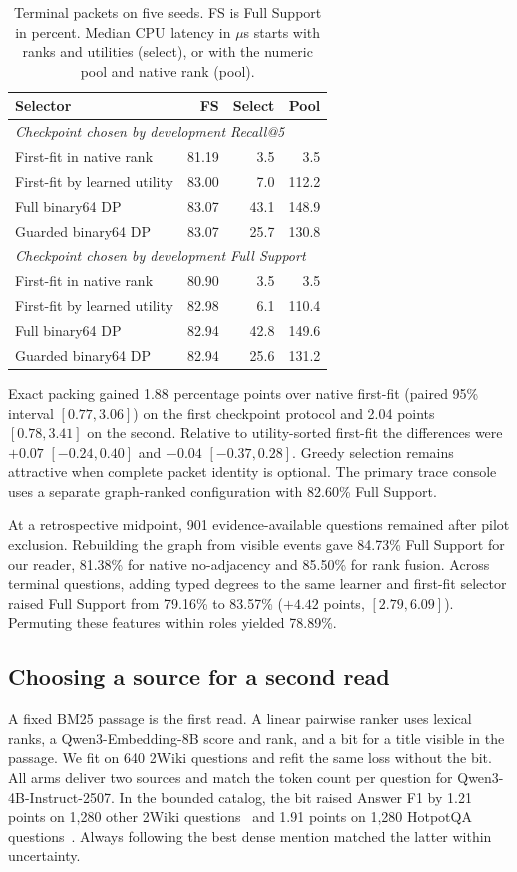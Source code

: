 \documentclass[conference]{IEEEtran}
\begin{document}
\begin{table}[t]
\caption{Terminal packets on five seeds. FS is Full Support in percent. Median CPU latency in $\mu$s starts with ranks and utilities (select), or with the numeric pool and native rank (pool).}
\centering\small
\begin{tabular}{@{}lrrr@{}}\toprule
Selector & FS & Select & Pool\\\midrule
\multicolumn{4}{l}{\textit{Checkpoint chosen by development Recall@5}}\\
First-fit in native rank & 81.19 & 3.5 & 3.5\\
First-fit by learned utility & 83.00 & 7.0 & 112.2\\
Full binary64 DP & 83.07 & 43.1 & 148.9\\
Guarded binary64 DP & 83.07 & 25.7 & 130.8\\\midrule
\multicolumn{4}{l}{\textit{Checkpoint chosen by development Full Support}}\\
First-fit in native rank & 80.90 & 3.5 & 3.5\\
First-fit by learned utility & 82.98 & 6.1 & 110.4\\
Full binary64 DP & 82.94 & 42.8 & 149.6\\
Guarded binary64 DP & 82.94 & 25.6 & 131.2\\
\bottomrule\end{tabular}
\label{tab:retrieval}
\end{table}

Exact packing gained 1.88 percentage points over native first-fit (paired 95\% interval $[0.77,3.06]$) on the first checkpoint protocol and 2.04 points $[0.78,3.41]$ on the second. Relative to utility-sorted first-fit the differences were $+0.07$ $[-0.24,0.40]$ and $-0.04$ $[-0.37,0.28]$. Greedy selection remains attractive when complete packet identity is optional. The primary trace console uses a separate graph-ranked configuration with 82.60\% Full Support.

At a retrospective midpoint, 901 evidence-available questions remained after pilot exclusion. Rebuilding the graph from visible events gave 84.73\% Full Support for our reader, 81.38\% for native no-adjacency and 85.50\% for rank fusion. Across terminal questions, adding typed degrees to the same learner and first-fit selector raised Full Support from 79.16\% to 83.57\% ($+4.42$ points, $[2.79,6.09]$). Permuting these features within roles yielded 78.89\%.

\subsection{Choosing a source for a second read}
A fixed BM25 passage is the first read. A linear pairwise ranker uses lexical ranks, a Qwen3-Embedding-8B score and rank, and a bit for a title visible in the passage. We fit on 640 2Wiki questions and refit the same loss without the bit. All arms deliver two sources and match the token count per question for Qwen3-4B-Instruct-2507. In the bounded catalog, the bit raised Answer F1 by 1.21 points on 1,280 other 2Wiki questions~\cite{ho2wiki} and 1.91 points on 1,280 HotpotQA questions~\cite{hotpot}. Always following the best dense mention matched the latter within uncertainty.
\end{document}
